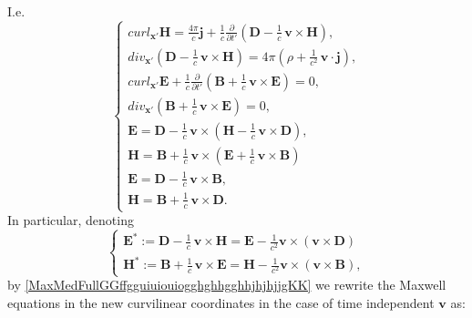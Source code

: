 \documentclass{article}
\theoremstyle{definition}
\theoremstyle{remark}
\renewcommand{\vec}[1]{\mathbf{#1}}
\newcommand{\R}{\mathbb{R}}
\newcommand{\er}{\eqref}
\newcommand{\R}{{\mathbb{R}}}
\newcommand{\er}{\eqref}
\begin{document}
I.e.
\begin{equation}\label{MaxMedFullGGffgguiuiouiogghghhgghhjhjhjjgKK}
\begin{cases}
curl_{\vec x'}\vec H= \frac{4\pi}{c}\vec j+
\frac{1}{c}\frac{\partial }{\partial
t'}\left(\vec D-\frac{1}{c}\,\vec v\times \vec H\right),\\
div_{\vec x'}\left(\vec D-\frac{1}{c}\,\vec v\times \vec H\right)= 4\pi\left(\rho+\frac{1}{c^2}\,\vec v\cdot\vec j\right),\\
curl_{\vec x'}\vec E+\frac{1}{c}\frac{\partial}{\partial
t'}\left(\vec B+\frac{1}{c}\,\vec v\times \vec E\right)=0,\\
div_{\vec x'}\left(\vec B+\frac{1}{c}\,\vec v\times \vec E\right)=0,\\
\vec E=\vec D-\frac{1}{c}\,\vec v\times \left(\vec H-\frac{1}{c}\,\vec v\times \vec D\right),\\
\vec H=\vec B+\frac{1}{c}\,\vec v\times \left(\vec
E+\frac{1}{c}\,\vec v\times \vec B\right)
\\
\vec E=\vec D-\frac{1}{c}\,\vec v\times \vec B,\\
\vec H=\vec B+\frac{1}{c}\,\vec v\times \vec D.
\end{cases}
\end{equation}
In particular, denoting
\begin{equation}\label{giuuihjghgghjgj78zzrrZZffhhhggygghghjhvbgghhjyuuyKK}
\begin{cases}
\vec E^*:=\vec D-\frac{1}{c}\,\vec v\times \vec H=\vec
E-\frac{1}{c^2}\vec v\times\left(\vec v\times\vec D\right)
\\
\vec H^*:=\vec B+\frac{1}{c}\,\vec v\times \vec E=\vec
H-\frac{1}{c^2}\vec v\times\left(\vec v\times\vec B\right),
\end{cases}
\end{equation}
by \er{MaxMedFullGGffgguiuiouiogghghhgghhjhjhjjgKK} we rewrite the
Maxwell equations in the new curvilinear coordinates in the case of
time independent $\vec v$ as:
\end{document}
